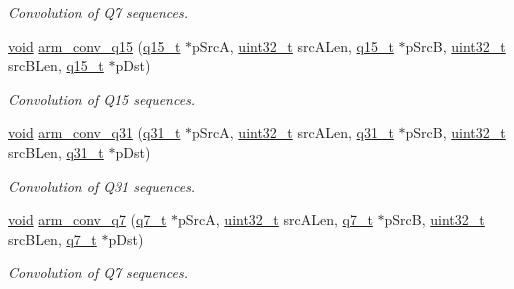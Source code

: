 \begin{DoxyCompactItemize}
\begin{DoxyCompactList}\small\item\em Convolution of Q7 sequences. \end{DoxyCompactList}\item 
\hyperlink{group___n_a_m_e_ga18028b8badbf1ea7e704ccac3c488e82}{void} \hyperlink{group___conv_gaccd6a89b0ff7a94df64610598e6e6893}{arm\-\_\-conv\-\_\-q15} (\hyperlink{arm__math_8h_ab5a8fb21a5b3b983d5f54f31614052ea}{q15\-\_\-t} $\ast$p\-Src\-A, \hyperlink{stdint_8h_a435d1572bf3f880d55459d9805097f62}{uint32\-\_\-t} src\-A\-Len, \hyperlink{arm__math_8h_ab5a8fb21a5b3b983d5f54f31614052ea}{q15\-\_\-t} $\ast$p\-Src\-B, \hyperlink{stdint_8h_a435d1572bf3f880d55459d9805097f62}{uint32\-\_\-t} src\-B\-Len, \hyperlink{arm__math_8h_ab5a8fb21a5b3b983d5f54f31614052ea}{q15\-\_\-t} $\ast$p\-Dst)
\begin{DoxyCompactList}\small\item\em Convolution of Q15 sequences. \end{DoxyCompactList}\item 
\hyperlink{group___n_a_m_e_ga18028b8badbf1ea7e704ccac3c488e82}{void} \hyperlink{group___conv_ga946b58da734f1e4e78c91fcaab4b12b6}{arm\-\_\-conv\-\_\-q31} (\hyperlink{arm__math_8h_adc89a3547f5324b7b3b95adec3806bc0}{q31\-\_\-t} $\ast$p\-Src\-A, \hyperlink{stdint_8h_a435d1572bf3f880d55459d9805097f62}{uint32\-\_\-t} src\-A\-Len, \hyperlink{arm__math_8h_adc89a3547f5324b7b3b95adec3806bc0}{q31\-\_\-t} $\ast$p\-Src\-B, \hyperlink{stdint_8h_a435d1572bf3f880d55459d9805097f62}{uint32\-\_\-t} src\-B\-Len, \hyperlink{arm__math_8h_adc89a3547f5324b7b3b95adec3806bc0}{q31\-\_\-t} $\ast$p\-Dst)
\begin{DoxyCompactList}\small\item\em Convolution of Q31 sequences. \end{DoxyCompactList}\item 
\hyperlink{group___n_a_m_e_ga18028b8badbf1ea7e704ccac3c488e82}{void} \hyperlink{group___conv_gae2070cb792a167e78dbad8d06b97cdab}{arm\-\_\-conv\-\_\-q7} (\hyperlink{arm__math_8h_ae541b6f232c305361e9b416fc9eed263}{q7\-\_\-t} $\ast$p\-Src\-A, \hyperlink{stdint_8h_a435d1572bf3f880d55459d9805097f62}{uint32\-\_\-t} src\-A\-Len, \hyperlink{arm__math_8h_ae541b6f232c305361e9b416fc9eed263}{q7\-\_\-t} $\ast$p\-Src\-B, \hyperlink{stdint_8h_a435d1572bf3f880d55459d9805097f62}{uint32\-\_\-t} src\-B\-Len, \hyperlink{arm__math_8h_ae541b6f232c305361e9b416fc9eed263}{q7\-\_\-t} $\ast$p\-Dst)
\begin{DoxyCompactList}\small\item\em Convolution of Q7 sequences. \end{DoxyCompactList}\end{DoxyCompactItemize}


